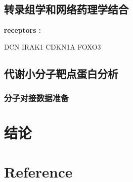 \documentclass[
]{article}
\begin{document}
\hypertarget{ux8f6cux5f55ux7ec4ux5b66ux548cux7f51ux7edcux836fux7406ux5b66ux7ed3ux5408}{%
\subsection{转录组学和网络药理学结合}\label{ux8f6cux5f55ux7ec4ux5b66ux548cux7f51ux7edcux836fux7406ux5b66ux7ed3ux5408}}

\begin{center}\begin{tcolorbox}[colback=gray!10, colframe=gray!50, width=0.9\linewidth, arc=1mm, boxrule=0.5pt]
\textbf{
receptors
:}

\vspace{0.5em}

    DCN
    IRAK1
    CDKN1A
    FOXO3

\vspace{2em}
\end{tcolorbox}
\end{center}

\hypertarget{ux4ee3ux8c22ux5c0fux5206ux5b50ux9776ux70b9ux86cbux767dux5206ux6790}{%
\subsection{代谢小分子靶点蛋白分析}\label{ux4ee3ux8c22ux5c0fux5206ux5b50ux9776ux70b9ux86cbux767dux5206ux6790}}

\hypertarget{ux5206ux5b50ux5bf9ux63a5ux6570ux636eux51c6ux5907}{%
\subsubsection{分子对接数据准备}\label{ux5206ux5b50ux5bf9ux63a5ux6570ux636eux51c6ux5907}}

\hypertarget{dis}{%
\section{结论}\label{dis}}

\hypertarget{bibliography}{%
\section*{Reference}\label{bibliography}}
\end{document}
